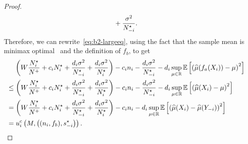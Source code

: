 \begin{proof}
\begin{align*}
{        }
        +\frac{\sigma^2}{N^\star_{-i}} .
    \end{align*}
    Therefore, we can rewrite~\eqref{eq:b2-largeeq}, using the fact that the sample mean is minimax optimal~\citep{lehmann2006theory} and the definition of $f_b$, to get
    \begin{align*}
        &\hspace{0.4cm}
        \left(
            W \frac{N^\star_i}{N^{+}} + c_i N^\star_i  +  \frac{d_i\sigma^2}{N^\star_{-i}} +  \frac{d_i\sigma^2}{ N^\star_i} 
        \right)
        -c_in_i
        -\frac{d_i\sigma^2}{N^\star_{-i}}
        -d_i
        \sup_{\mu\in\mathbb{R}}
        \mathbb{E}\left[
            \left(
                \widehat{\mu}(f_a(X_{i}))-\mu
            \right)^2
        \right]
        \\
        &\leq
        \left(
            W \frac{N^\star_i}{N^{+}} + c_i N^\star_i  +  \frac{d_i\sigma^2}{N^\star_{-i}} +  \frac{d_i\sigma^2}{ N^\star_i} 
        \right)
        -c_in_i
        -\frac{d_i\sigma^2}{N^\star_{-i}}
        -d_i
        \sup_{\mu\in\mathbb{R}}
        \mathbb{E}\left[
            \left(
                \widehat{\mu}(X_{i})-\mu
            \right)^2
        \right]
        \\
        &=
        \left(
            W \frac{N^\star_i}{N^{+}} + c_i N^\star_i  +  \frac{d_i\sigma^2}{N^\star_{-i}} +  \frac{d_i\sigma^2}{ N^\star_i} 
        \right)
        -c_in_i
        -d_i
        \sup_{\mu\in\mathbb{R}}
        \mathbb{E}\left[
            \left(
                \widehat{\mu}(X_{i})-\widehat{\mu}(Y_{-i})
            \right)^2
        \right]
        \\
        &=
        u^{\rm c}_{i} \left(M, \left((n_i,f_b),s_{-i}^{\star} \right)\right) .
    \end{align*}
    
\end{proof}

